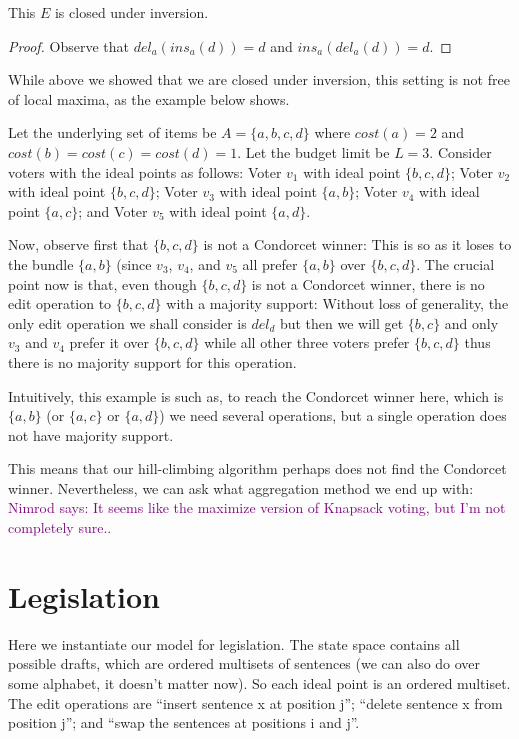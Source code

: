 \documentclass[sigconf]{aamas}  %
\newcommand{\nimrod}[1]{\textcolor{purple}{Nimrod says: #1}}
\begin{document}
\begin{lemma}
  This $E$ is closed under inversion.
\end{lemma}

\begin{proof}
  Observe that $del_a(ins_a(d)) = d$ and $ins_a(del_a(d)) = d$.
\end{proof}

While above we showed that we are closed under inversion,
this setting is not free of local maxima, as the example below shows.

\begin{example}
%
Let the underlying set of items be $A = \{a, b, c, d\}$ where $cost(a) = 2$ and $cost(b) = cost(c) = cost(d) = 1$. Let the budget limit be $L = 3$.
Consider voters with the ideal points as follows:
  Voter $v_1$ with ideal point $\{b,c,d\}$;
  Voter $v_2$ with ideal point $\{b,c,d\}$;
  Voter $v_3$ with ideal point $\{a,b\}$;
  Voter $v_4$ with ideal point $\{a,c\}$;
  and Voter $v_5$ with ideal point $\{a,d\}$.

Now, observe first that $\{b,c,d\}$ is not a Condorcet winner:
  This is so as it loses to the bundle $\{a,b\}$ (since $v_3$, $v_4$, and $v_5$ all prefer $\{a,b\}$ over $\{b,c,d\}$.
The crucial point now is that, even though $\{b,c,d\}$ is not a Condorcet winner,
there is no edit operation to $\{b,c,d\}$ with a majority support:
  Without loss of generality, the only edit operation we shall consider is $del_d$ but then we will get $\{b,c\}$ and only $v_3$ and $v_4$ prefer it over $\{b,c,d\}$ while all other three voters prefer $\{b,c,d\}$ thus there is no majority support for this operation.

Intuitively, this example is such as, to reach the Condorcet winner here, which is $\{a,b\}$ (or $\{a,c\}$ or $\{a,d\}$) we need several operations, but a single operation does not have majority support.
%
\end{example}

This means that our hill-climbing algorithm perhaps does not find the Condorcet winner.
Nevertheless, we can ask what aggregation method we end up with:
  \nimrod{It seems like the maximize version of Knapsack voting, but I'm not completely sure..}


\section{Legislation}

Here we instantiate our model for legislation.
The state space contains all possible drafts, which are ordered multisets of sentences (we can also do over some alphabet, it doesn't matter now). So each ideal point is an ordered multiset. The edit operations are ``insert sentence x at position j''; ``delete sentence x from position j''; and ``swap the sentences at positions i and j''.
\end{document}
